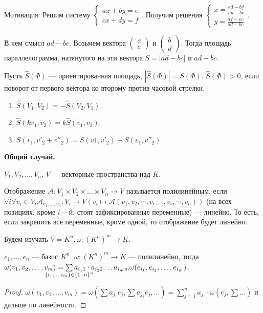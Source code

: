 Мотивация: Решим систему $\begin{cases} ax+by=e \\ cx+dy=f \end{cases}$. Получим решения  $\begin{cases} x = \frac{ed - bf}{ad - bc} \\ y = \frac{af - ec}{ad - bc} \end{cases}$. 

В чем смысл $ad - bc$. Возьмем вектора  $\begin{pmatrix} a \\ c \end{pmatrix}$ и $\begin{pmatrix} b \\ d \end{pmatrix}$. Тогда площадь параллелограмма, натянутого на эти вектора $S = |ad-bc|$ и $ad - bc$.

Пусть $\widehat{S}(\Phi)$ --- ориентированная площадь,  $|\widehat{S}(\Phi)| = S(\Phi)$.  $\widehat{S}(\Phi) > 0$, если поворот от первого вектора ко второму против часовой стрелки.

\begin{properties}
    \begin{enumerate}
        \item $\widehat{S}(V_1, V_2) = -\widehat{S}(V_2, V_1)$.
        \item $\widehat{S}(kv_1, v_2) = k \widehat{S}(v_1, v_2)$.
        \item $S(v_1, v'_2 + v''_2) = S(v1, v'_2) + S(v_1, v''_2)$
    \end{enumerate}
\end{properties}

\textbf{\huge Общий случай.}

\begin{definition}
    $V_1, V_2, \ldots, V_n$, $V$ ---  векторные пространства над $K$.

    Отображение  $\mathcal{A}\!: V_1 \times V_2 \times \ldots \times V_n \to V$ называется полилинейным, если $\forall i \forall v_i \in V_i \mathcal{A}_{v_1, \ldots, v_n}\!: V_i \to V (v_i \mapsto \mathcal{A}(v_1, v_2, \cdots, v_{i-1}, v_i, \cdots, v_n))$ (на всех позициях, кроме $i-$й, стоят зафиксированные переменные) --- линейно. То есть, если закрепить все переменные, кроме одной, то отображение будет линейно.
\end{definition}

Будем изучать $V = K^n, \omega\!: (K^n)^m \to K$.
 \begin{lemma}
    $e_1, \ldots, e_n$ --- базис $K^n$.  $\omega\!: (K^n)^m \to K$ --- полилинейно, тогда $\omega(v_1, v_2, \ldots, v_m) = \sum\limits_{\mathclap{\{i_1, \ldots, i_m\} \in \{1..n\}^n}} a_{i_1 1}\cdot a_{i_2 2}\ldots a_{i_m m} \omega(e_{i_1}, e_{i_2},\ldots, e_{i_m})$.
\end{lemma}
\begin{proof}
    $\omega(v_1, v_2, \ldots, v_m) = \omega(\sum a_{j_1} e_j, \sum a_{j_2} e_j, \ldots) = \sum\limits_{j=1}^n a_{j_1} \cdot \omega(e_j, \sum \ldots)$ и дальше по линейности.
\end{proof}

